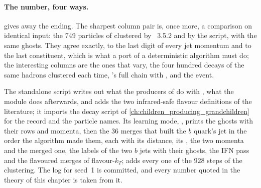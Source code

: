 \paragraph{The number, four ways.}
\label{sec:family_photograph:validation}
\label{sec:family_photograph:standalone_code}
 gives away the ending. The sharpest
column pair is, once more, a comparison on identical input: the 749
particles of  clustered by \FASTJET~3.5.2 and by the
script, with the same ghosts. They agree exactly, to the last digit of
every jet momentum and to the last constituent, which is what a port of a
deterministic algorithm must do; the interesting columns are the ones
that vary, the four hundred decays of the same hadrons clustered each
time, \PYTHIA's full chain with \FASTJET, and the \CMSSW event.

The standalone script writes out what the  producers of
\CMSSW do with \FASTJET, what the  module does
afterwards, and adds the two infrared-safe flavour definitions of the
literature; it imports the decay script of
\cref{ch:children_producing_grandchildren} for the record and the
particle names. Its learning mode, , prints the ghosts with their
rows and momenta, then the $36$ merges that built the $b$ quark's \akfour
jet in the order the algorithm made them, each with its distance, its
\dR, the two momenta and the merged one, the labels of the two $b$ jets
with their ghosts, the IFN pass and the
flavoured merges of flavour-$k_T$;  adds every one of the $928$
steps of the clustering. The  log for seed~1 is committed, and
every number quoted in the theory of this chapter is taken from it.
\label{sec:family_photograph:fastjet}

